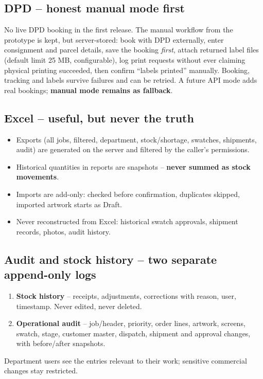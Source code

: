\subsection{DPD -- honest manual mode first}

No live DPD booking in the first release. The manual workflow from the prototype is kept,
but server-stored: book with DPD externally, enter consignment and parcel details, save
the booking \emph{first}, attach returned label files (default limit 25 MB, configurable),
log print requests without ever claiming physical printing succeeded, then confirm
``labels printed'' manually. Booking, tracking and labels survive failures and can be
retried. A future API mode adds real bookings; \textbf{manual mode remains as fallback}.

\subsection{Excel -- useful, but never the truth}

\begin{itemize}
  \item Exports (all jobs, filtered, department, stock/shortage, swatches, shipments,
        audit) are generated on the server and filtered by the caller's permissions.
  \item Historical quantities in reports are snapshots -- \textbf{never summed as stock
        movements}.
  \item Imports are add-only: checked before confirmation, duplicates skipped, imported
        artwork starts as Draft.
  \item Never reconstructed from Excel: historical swatch approvals, shipment records,
        photos, audit history.
\end{itemize}

\subsection{Audit and stock history -- two separate append-only logs}

\begin{enumerate}
  \item \textbf{Stock history} -- receipts, adjustments, corrections with reason, user,
        timestamp. Never edited, never deleted.
  \item \textbf{Operational audit} -- job/header, priority, order lines, artwork,
        screens, swatch, stage, customer master, dispatch, shipment and approval
        changes, with before/after snapshots.
\end{enumerate}
Department users see the entries relevant to their work; sensitive commercial changes
stay restricted.
